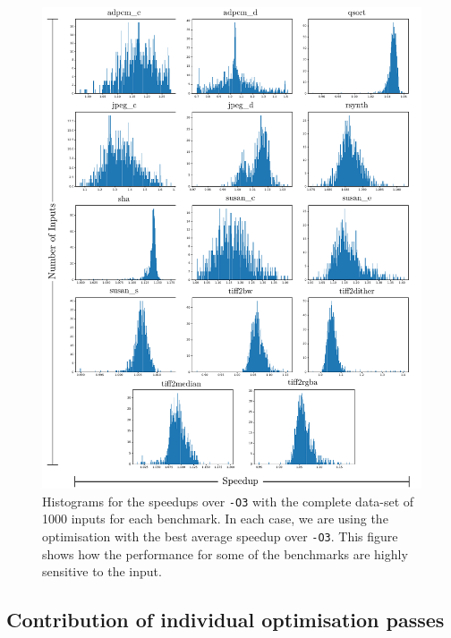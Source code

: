 \begin{figure}[h!]
    \centering
    \includegraphics[width=\textwidth]{figs/speedups-per-input.pdf}
    \caption{Histograms for the speedups over \texttt{-O3} with the complete data-set of 1000 inputs for each benchmark.
             In each case, we are using the optimisation with the best average speedup over \texttt{-O3}.
             This figure shows how the performance for some of the benchmarks are highly sensitive to the input.}

    \label{fig:speedups-per-input}
\end{figure}


\subsection{Contribution of individual optimisation passes}

